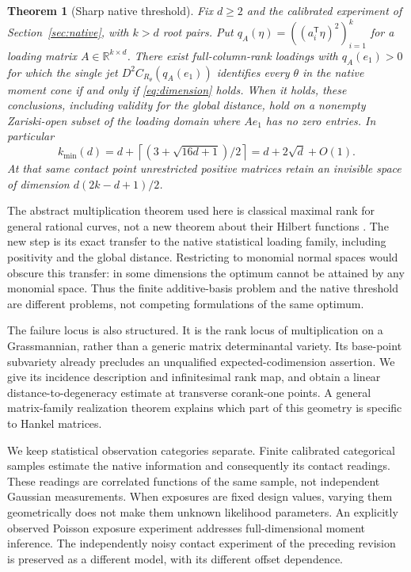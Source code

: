 \documentclass[11pt,reqno]{amsart}
\numberwithin{equation}{section}
\newtheorem{theorem}{Theorem}[section]
\theoremstyle{definition}\newtheorem{definition}[theorem]{Definition}
\theoremstyle{remark}\newtheorem{remark}[theorem]{Remark}
\newcommand{\R}{\mathbb R}
\begin{document}
\begin{theorem}[Sharp native threshold]\label{thm:main}
Fix $d\ge2$ and the calibrated experiment of Section~\ref{sec:native}, with $k>d$ root pairs. Put $q_A(\eta)=((a_i^{\mathsf T}\eta)^2)_{i=1}^k$ for a loading matrix $A\in\R^{k\times d}$. There exist full-column-rank loadings with $q_A(e_1)>0$ for which the single jet $D^2C_{R_\theta}(q_A(e_1))$ identifies every $\theta$ in the native moment cone if and only if \eqref{eq:dimension} holds. When it holds, these conclusions, including validity for the global distance, hold on a nonempty Zariski-open subset of the loading domain where $Ae_1$ has no zero entries. In particular
\begin{equation}\label{eq:threshold}
 k_{\min}(d)=d+\left\lceil(3+\sqrt{16d+1})/2\right\rceil
           =d+2\sqrt d+O(1).
\end{equation}
At that same contact point unrestricted positive matrices retain an invisible space of dimension $d(2k-d+1)/2$.
\end{theorem}

The abstract multiplication theorem used here is classical maximal rank for general rational curves, not a new theorem about their Hilbert functions \cite{BE85,BE87}. The new step is its exact transfer to the native statistical loading family, including positivity and the global distance. Restricting to monomial normal spaces would obscure this transfer: in some dimensions the optimum cannot be attained by any monomial space. Thus the finite additive-basis problem and the native threshold are different problems, not competing formulations of the same optimum.

The failure locus is also structured. It is the rank locus of multiplication on a Grassmannian, rather than a generic matrix determinantal variety. Its base-point subvariety already precludes an unqualified expected-codimension assertion. We give its incidence description and infinitesimal rank map, and obtain a linear distance-to-degeneracy estimate at transverse corank-one points. A general matrix-family realization theorem explains which part of this geometry is specific to Hankel matrices.

We keep statistical observation categories separate. Finite calibrated categorical samples estimate the native information and consequently its contact readings. These readings are correlated functions of the same sample, not independent Gaussian measurements. When exposures are fixed design values, varying them geometrically does not make them unknown likelihood parameters. An explicitly observed Poisson exposure experiment addresses full-dimensional moment inference. The independently noisy contact experiment of the preceding revision is preserved as a different model, with its different offset dependence.
\end{document}
